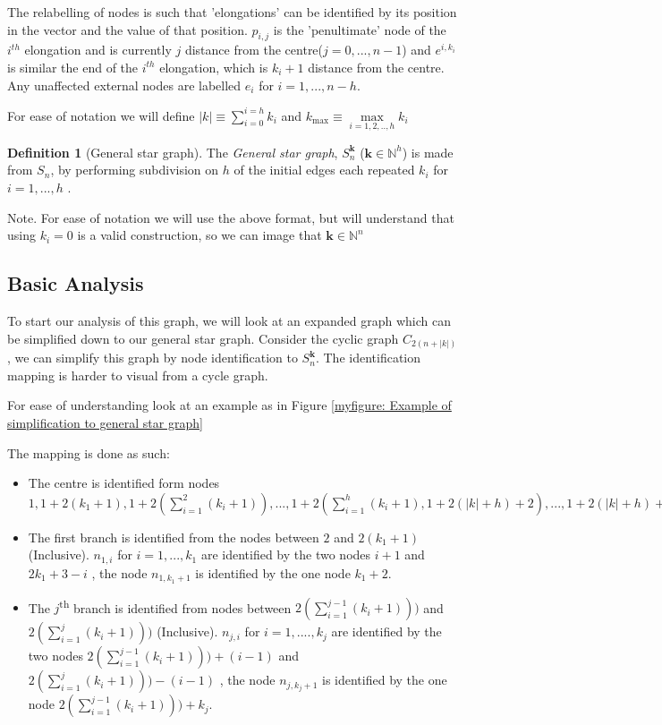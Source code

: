 \documentclass[a4paper,10pt]{article}
\theoremstyle{definition}
\newtheorem{definition}[theorem]{Definition}
\theoremstyle{definition}
\theoremstyle{remark}
\theoremstyle{definition}
\begin{document}
The relabelling of nodes is such that 'elongations' can be identified by its position in the vector and the value of that position. $p_{i,j}$ is the 'penultimate' node of the $i^{th}$ elongation and is currently $j$ distance from the centre($j=0,...,n-1$) and $e^{i,k_{i}}$ is similar the end of the $i^{th}$ elongation, which is $k_{i}+1$ distance from the centre. Any unaffected external nodes are labelled $e_{i}$ for $i=1,...,n-h$.

For ease of notation we will define $ |k| \equiv \sum\limits_{i=0}^{i=h} k_{i}$ and $ k_{\max} \equiv \max\limits_{i=1,2,..,h} k_{i}$

\begin{definition}[General star graph]
The \textit{General star graph}, $S^{\bm{k}}_{n}$ ($\bm{k} \in \mathbb{N}^{h}$) is made from $S_{n}$, by performing subdivision on $h$ of the  initial edges each repeated $k_{i}$ for $i=1,...,h$ . 
\end{definition}

Note. For ease of notation we will use the above format, but will understand that using $k_{i}=0$ is a valid construction, so we can image that $\bm{k} \in \mathbb{N}^n$


\subsection{Basic Analysis}
To start our analysis of this graph, we will look at an expanded graph which can be simplified down to our general star graph. Consider the cyclic graph $C_{2(n+|k|)}$ , we can simplify this graph by node identification to $S^{\bm{k}}_{n}$. The identification mapping is harder to visual from a cycle graph.

For ease of understanding look at an example as in Figure \ref{myfigure: Example of simplification to general star graph}

The mapping is done as such:
\begin{itemize}
\item The centre is identified form nodes $1,1+2(k_{1}+1),1+2(\sum\limits_{i=1}^{2} (k_{i}+1)),...,1+2(\sum\limits_{i=1}^{h}(k_{i}+1),1+2(|k|+h)+2),...,1+2(|k|+h)+2(n-h)$

\item The first branch is identified from the nodes between $2$ and $2(k_{1}+1)$ (Inclusive). $n_{1,i}$ for $i=1,...,k_{1}$ are identified by the two nodes $i+1$ and $2k_{1}+3-i$ , the node $n_{1,k_{1}+1}$ is identified by the one node $k_{1}+2$.

\item The $j$\textsuperscript{th} branch is identified from nodes between $2(\sum\limits_{i=1}^{j-1} (k_{i}+1)))$ and $2(\sum\limits_{i=1}^{j} (k_{i}+1)))$ (Inclusive). $n_{j,i}$ for $i=1,....,k_{j}$ are identified by the two nodes $2(\sum\limits_{i=1}^{j-1} (k_{i}+1)))+(i-1)$ and $2(\sum\limits_{i=1}^{j} (k_{i}+1)))-(i-1)$ , the node $n_{j,k_{j}+1}$ is identified by the one node $2(\sum\limits_{i=1}^{j-1} (k_{i}+1)))+k_{j}$.
\end{itemize}
\end{document}
